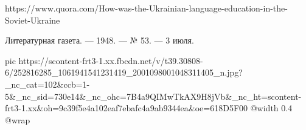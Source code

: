  
 
 
 
 

https://www.quora.com/How-was-the-Ukrainian-language-education-in-the-Soviet-Ukraine

Литературная газета. — 1948. — № 53. — 3 июля.

\ifcmt
  pic https://scontent-frt3-1.xx.fbcdn.net/v/t39.30808-6/252816285_1061941541231419_2001098001048311405_n.jpg?_nc_cat=102&ccb=1-5&_nc_sid=730e14&_nc_ohc=7B4a9QIMwTkAX9H8jVb&_nc_ht=scontent-frt3-1.xx&oh=9c39f5e4a102eaf7ebafc4a9ab9344ea&oe=618D5F00
  @width 0.4
  @wrap \parpic[r]
\fi
